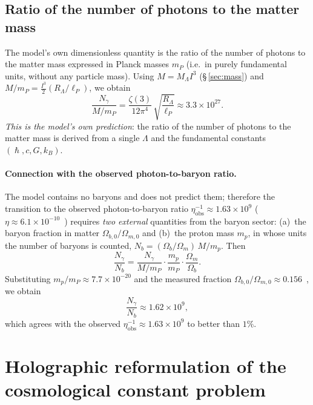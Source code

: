 \documentclass[10pt,a4paper]{article}
\DeclareRobustCommand{\hbar}{\hslash}
\begin{document}
\subsection{Ratio of the number of photons to the matter mass}
The model's own dimensionless quantity is the ratio of the number of photons to the matter mass expressed in Planck masses $m_P$ (i.e.\ in purely fundamental units, without any particle mass). Using $M = M_\Lambda I^3$ (\S\,\ref{sec:mass}) and $M/m_P = \tfrac{I^3}{2}(R_\Lambda/\ell_P)$, we obtain
\begin{equation}
\boxed{\frac{N_\gamma}{M/m_P} = \frac{\zeta(3)}{12\pi^4}\,\sqrt{\frac{R_\Lambda}{\ell_P}} \approx 3.3 \times 10^{27}.} \label{eq:ratio_particles}
\end{equation}
\emph{This is the model's own prediction}: the ratio of the number of photons to the matter mass is derived from a single $\Lambda$ and the fundamental constants $(\hbar,c,G,k_B)$.

\paragraph{Connection with the observed photon-to-baryon ratio.} The model contains no baryons and does not predict them; therefore the transition to the observed photon-to-baryon ratio $\eta^{-1}_{\mathrm{obs}}\approx1.63\times10^9$ ($\eta\approx6.1\times10^{-10}$~\cite{Planck2018}) requires \emph{two external} quantities from the baryon sector: (a)~the baryon fraction in matter $\Omega_{b,0}/\Omega_{m,0}$ and (b)~the proton mass $m_p$, in whose units the number of baryons is counted, $N_b = (\Omega_b/\Omega_m)\,M/m_p$. Then
\begin{equation}
\frac{N_\gamma}{N_b} = \frac{N_\gamma}{M/m_P}\cdot\frac{m_p}{m_P}\cdot\frac{\Omega_m}{\Omega_b}.
\end{equation}
Substituting $m_p/m_P\approx7.7\times10^{-20}$ and the measured fraction $\Omega_{b,0}/\Omega_{m,0}\approx0.156$~\cite{Planck2018}, we obtain
\begin{equation}
\boxed{\frac{N_\gamma}{N_b} \approx 1.62\times10^{9},}
\end{equation}
which agrees with the observed $\eta^{-1}_{\mathrm{obs}}\approx1.63\times10^9$ to better than $1\%$.

\section{Holographic reformulation of the cosmological constant problem}
\end{document}
